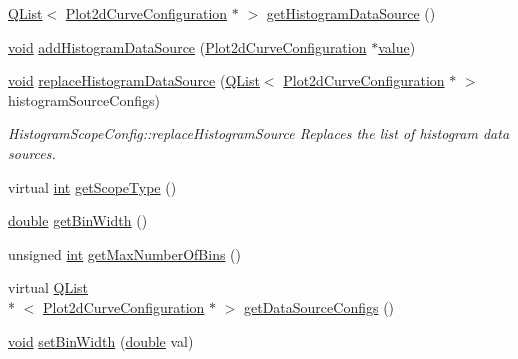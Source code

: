 \begin{DoxyCompactItemize}
\item 
\hyperlink{class_q_list}{Q\-List}$<$ \hyperlink{struct_plot2d_curve_configuration}{Plot2d\-Curve\-Configuration} $\ast$ $>$ \hyperlink{group___scope_plugin_gac01f208b6d79e28b2f148abc13d6b0b9}{get\-Histogram\-Data\-Source} ()
\item 
\hyperlink{group___u_a_v_objects_plugin_ga444cf2ff3f0ecbe028adce838d373f5c}{void} \hyperlink{group___scope_plugin_ga2092a20c3f43c9eb68d370e7dc98cd2b}{add\-Histogram\-Data\-Source} (\hyperlink{struct_plot2d_curve_configuration}{Plot2d\-Curve\-Configuration} $\ast$\hyperlink{glext_8h_aa0e2e9cea7f208d28acda0480144beb0}{value})
\item 
\hyperlink{group___u_a_v_objects_plugin_ga444cf2ff3f0ecbe028adce838d373f5c}{void} \hyperlink{group___scope_plugin_gaa036bf883eaa724bb577ee9de902dce1}{replace\-Histogram\-Data\-Source} (\hyperlink{class_q_list}{Q\-List}$<$ \hyperlink{struct_plot2d_curve_configuration}{Plot2d\-Curve\-Configuration} $\ast$ $>$ histogram\-Source\-Configs)
\begin{DoxyCompactList}\small\item\em Histogram\-Scope\-Config\-::replace\-Histogram\-Source Replaces the list of histogram data sources. \end{DoxyCompactList}\item 
virtual \hyperlink{ioapi_8h_a787fa3cf048117ba7123753c1e74fcd6}{int} \hyperlink{group___scope_plugin_ga232680e8671b7a4e205a11f5f164aa1a}{get\-Scope\-Type} ()
\item 
\hyperlink{_super_l_u_support_8h_a8956b2b9f49bf918deed98379d159ca7}{double} \hyperlink{group___scope_plugin_gac7c220940b1b3c4c51997623b0268f3d}{get\-Bin\-Width} ()
\item 
unsigned \hyperlink{ioapi_8h_a787fa3cf048117ba7123753c1e74fcd6}{int} \hyperlink{group___scope_plugin_ga4b72da75ea27852393740b47bf6f6ae5}{get\-Max\-Number\-Of\-Bins} ()
\item 
virtual \hyperlink{class_q_list}{Q\-List}\\*
$<$ \hyperlink{struct_plot2d_curve_configuration}{Plot2d\-Curve\-Configuration} $\ast$ $>$ \hyperlink{group___scope_plugin_ga79e96fd6c2de93da275c9d1b3c568e95}{get\-Data\-Source\-Configs} ()
\item 
\hyperlink{group___u_a_v_objects_plugin_ga444cf2ff3f0ecbe028adce838d373f5c}{void} \hyperlink{group___scope_plugin_ga692ce41b341567916c0ff62a541b4138}{set\-Bin\-Width} (\hyperlink{_super_l_u_support_8h_a8956b2b9f49bf918deed98379d159ca7}{double} val)
\item 

\end{DoxyCompactItemize}
